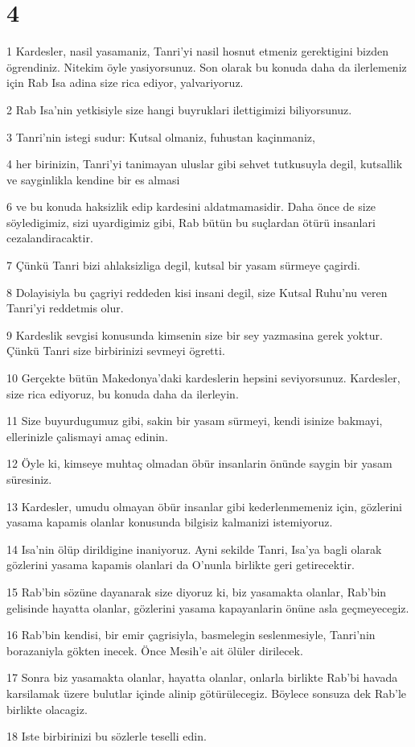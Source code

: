 \chapter{4}

\par 1 Kardesler, nasil yasamaniz, Tanri'yi nasil hosnut etmeniz gerektigini bizden ögrendiniz. Nitekim öyle yasiyorsunuz. Son olarak bu konuda daha da ilerlemeniz için Rab Isa adina size rica ediyor, yalvariyoruz.
\par 2 Rab Isa'nin yetkisiyle size hangi buyruklari ilettigimizi biliyorsunuz.
\par 3 Tanri'nin istegi sudur: Kutsal olmaniz, fuhustan kaçinmaniz,
\par 4 her birinizin, Tanri'yi tanimayan uluslar gibi sehvet tutkusuyla degil, kutsallik ve sayginlikla kendine bir es almasi
\par 6 ve bu konuda haksizlik edip kardesini aldatmamasidir. Daha önce de size söyledigimiz, sizi uyardigimiz gibi, Rab bütün bu suçlardan ötürü insanlari cezalandiracaktir.
\par 7 Çünkü Tanri bizi ahlaksizliga degil, kutsal bir yasam sürmeye çagirdi.
\par 8 Dolayisiyla bu çagriyi reddeden kisi insani degil, size Kutsal Ruhu'nu veren Tanri'yi reddetmis olur.
\par 9 Kardeslik sevgisi konusunda kimsenin size bir sey yazmasina gerek yoktur. Çünkü Tanri size birbirinizi sevmeyi ögretti.
\par 10 Gerçekte bütün Makedonya'daki kardeslerin hepsini seviyorsunuz. Kardesler, size rica ediyoruz, bu konuda daha da ilerleyin.
\par 11 Size buyurdugumuz gibi, sakin bir yasam sürmeyi, kendi isinize bakmayi, ellerinizle çalismayi amaç edinin.
\par 12 Öyle ki, kimseye muhtaç olmadan öbür insanlarin önünde saygin bir yasam süresiniz.
\par 13 Kardesler, umudu olmayan öbür insanlar gibi kederlenmemeniz için, gözlerini yasama kapamis olanlar konusunda bilgisiz kalmanizi istemiyoruz.
\par 14 Isa'nin ölüp dirildigine inaniyoruz. Ayni sekilde Tanri, Isa'ya bagli olarak gözlerini yasama kapamis olanlari da O'nunla birlikte geri getirecektir.
\par 15 Rab'bin sözüne dayanarak size diyoruz ki, biz yasamakta olanlar, Rab'bin gelisinde hayatta olanlar, gözlerini yasama kapayanlarin önüne asla geçmeyecegiz.
\par 16 Rab'bin kendisi, bir emir çagrisiyla, basmelegin seslenmesiyle, Tanri'nin borazaniyla gökten inecek. Önce Mesih'e ait ölüler dirilecek.
\par 17 Sonra biz yasamakta olanlar, hayatta olanlar, onlarla birlikte Rab'bi havada karsilamak üzere bulutlar içinde alinip götürülecegiz. Böylece sonsuza dek Rab'le birlikte olacagiz.
\par 18 Iste birbirinizi bu sözlerle teselli edin.

